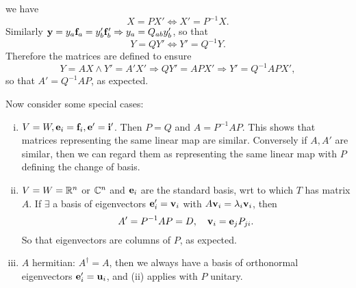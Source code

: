 \documentclass[10pt]{article}
\begin{document}
    we have 
    \[
        X=PX' \Longleftrightarrow X'=P^{-1}X.
    \]
    Similarly $ {\bf y} = y_a{\bf f}_a = y_b'{\bf f}_b' \Rightarrow y_a=Q_{ab}y_b' $, so that 
    \[
        Y=QY' \Longleftrightarrow Y'=Q^{-1}Y.
    \]
    Therefore the matrices are defined to ensure 
    \[
        Y=AX \land Y'=A'X' \Longrightarrow QY'=APX' \Longrightarrow Y'=Q^{-1}APX',
    \]
    so that $ A'=Q^{-1}AP $, as expected.

    Now consider some special cases:
    \begin{enumerate}[(i)]
        \item $V=W, {\bf e}_i={\bf f}_i, {\bf e}'={\bf i}'$. Then $P=Q$ and $ A = P^{-1}AP $. This shows that matrices representing the same linear map are similar. Conversely if $A,A'$ are similar, then we can regard them as representing the same linear map with $P$ defining the change of basis.
        \item $V=W={\mathbb{R}}^n$ or ${\mathbb{C}}^n$ and $ {\bf e}_i $ are the standard basis, wrt to which $T$ has matrix $A$. If $ \exists  $ a basis of eigenvectors $ {\bf e}_i'={\bf v}_i $ with $ A{\bf v}_i=\lambda_i{\bf v}_i $, then
        \[
            A'= P^{-1}AP = D, \quad {\bf v}_i = {\bf e}_jP_{ji}.
        \]
        So that eigenvectors are columns of $P$, as expected.
        \item $A$ hermitian: $ A^\dagger =A $, then we always have a basis of orthonormal eigenvectors $ {\bf e}_i'={\bf u}_i $, and (ii) applies with $P$ unitary.
    \end{enumerate}
\end{document}
